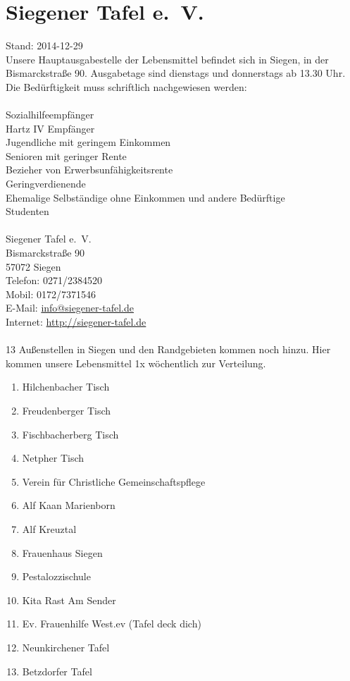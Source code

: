 \section{Siegener Tafel e.~V.}   
Stand: 2014-12-29\\
Unsere Hauptausgabestelle der Lebensmittel befindet sich in Siegen, in der Bismarckstraße 90. Ausgabetage sind dienstags und donnerstags ab 13.30 Uhr. Die Bedürftigkeit muss schriftlich nachgewiesen werden:\\
\\
Sozialhilfeempfänger\\
Hartz IV Empfänger\\
Jugendliche mit geringem Einkommen\\
Senioren mit geringer Rente\\
Bezieher von Erwerbsunfähigkeitsrente\\
Geringverdienende\\
Ehemalige Selbständige ohne Einkommen und andere Bedürftige\\
Studenten\\
\\
Siegener Tafel e.~V.\\
Bismarckstraße 90\\
57072 Siegen\\
Telefon: 0271/2384520\\
Mobil: 0172/7371546\\
E-Mail: \href{mailto:info@siegener-tafel.de}{info@siegener-tafel.de}\\
Internet: \href{http://siegener-tafel.de}{http://siegener-tafel.de}\\
\\
13 Außenstellen in Siegen und den Randgebieten kommen noch hinzu. Hier kommen unsere Lebensmittel 1x wöchentlich zur Verteilung. 
\begin{enumerate}
	\item Hilchenbacher Tisch
	\item Freudenberger Tisch
	\item Fischbacherberg Tisch
	\item Netpher Tisch
	\item Verein für Christliche Gemeinschaftspflege
	\item Alf Kaan Marienborn
	\item Alf Kreuztal
	\item Frauenhaus Siegen
	\item Pestalozzischule
	\item Kita Rast Am Sender
	\item Ev. Frauenhilfe West.ev (Tafel deck dich)
	\item Neunkirchener Tafel
	\item Betzdorfer Tafel 
\end{enumerate}